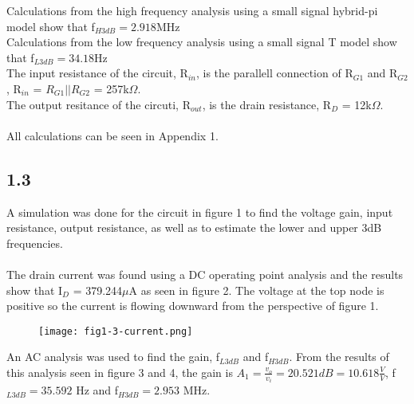   Calculations from the high frequency analysis using a small signal hybrid-pi model show that f$_{H 3dB} = 2.918$MHz\\

  Calculations from the low frequency analysis using a small signal T model show that f$_{L 3dB} = 34.18$Hz\\

  The input resistance of the circuit, R$_{in}$, is the parallell connection of R$_{G1}$ and R$_{G2}$, R$_{in}$ = $R_{G1}||R_{G2}$ = 257k$\Omega$.\\
  The output resitance of the circuti, R$_{out}$, is the drain resistance, R$_D$ = 12k$\Omega$.\\\\

  All calculations can be seen in Appendix 1.\\
\pagebreak
\subsection*{1.3}

  A simulation was done for the circuit in figure 1 to find the voltage gain, input resistance, output resistance, as well as to estimate the lower and upper 3dB frequencies.\\\\

  The drain current was found using a DC operating point analysis and the results show that I$_D$ = 379.244$\mu$A as seen in figure 2. The voltage at the top node is positive so the current is flowing downward from the perspective of figure 1.\\

  \begin{figure}[h!]
        \centering
        \texttt{[image: fig1-3-current.png]}
  \end{figure}

\pagebreak

  An AC analysis was used to find the gain, f$_{L 3dB}$ and f$_{H 3dB}$. From the results of this analysis seen in figure 3 and 4, the gain is $A_1 = \frac{v_o}{v_i} = 20.521 dB = 10.618 \frac{V}{V}$, f$_{L 3dB} = 35.592$ Hz and f$_{H 3dB} = 2.953$ MHz.\\

